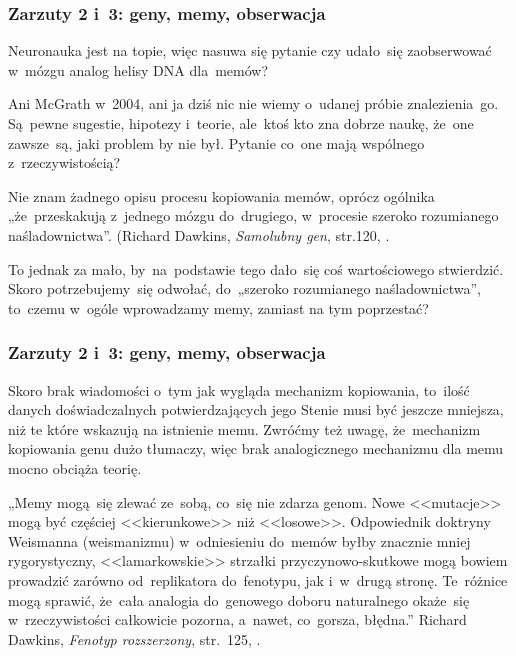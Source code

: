 \documentclass[10pt,t]{beamer}
\begin{document}
\begin{frame}
  \frametitle{Zarzuty 2 i~3: geny, memy, obserwacja}


  Neuronauka jest na topie, więc nasuwa się pytanie
  czy udało~się zaobserwować w~mózgu analog helisy DNA dla~memów?

  Ani McGrath w~2004, ani ja dziś nic nie wiemy o~udanej próbie
  znalezienia~go. Są~pewne sugestie, hipotezy i~teorie, ale~ktoś kto
  zna dobrze naukę, że~one zawsze~są, jaki problem by nie był.
  Pytanie co~one mają wspólnego z~rzeczywistością?

  Nie znam żadnego opisu procesu kopiowania memów, oprócz ogólnika
  „że~przeskakują z~jednego mózgu do~drugiego, w~procesie szeroko
  rozumianego naśladownictwa”. (Richard Dawkins, \textit{Samolubny gen},
  str.120, \cite{McGrathBogDawkinsa2008}.

  To jednak za mało, by~na~podstawie tego dało~się coś wartościowego
  stwierdzić. Skoro potrzebujemy~się odwołać, do~„szeroko
  rozumianego naśladownictwa”, to~czemu w~ogóle wprowadzamy memy,
  zamiast na tym poprzestać?

\end{frame}





\begin{frame}
  \frametitle{Zarzuty 2 i~3: geny, memy, obserwacja}


  Skoro brak wiadomości o~tym jak wygląda mechanizm kopiowania,
  to~ilość danych doświadczalnych potwierdzających jego Stenie musi być
  jeszcze mniejsza, niż te które wskazują na istnienie memu. Zwróćmy też
  uwagę, że~mechanizm kopiowania genu dużo tłumaczy, więc brak
  analogicznego mechanizmu dla memu mocno obciąża teorię.

  „Memy mogą~się zlewać ze~sobą, co~się nie zdarza genom. Nowe
  <<mutacje>> mogą być częściej <<kierunkowe>> niż <<losowe>>.
  Odpowiednik doktryny Weismanna (weismanizmu) w~odniesieniu
  do~memów byłby znacznie mniej rygorystyczny, <<lamarkowskie>>
  strzałki przyczynowo-skutkowe mogą bowiem prowadzić zarówno
  od~replikatora do~fenotypu, jak i~w~drugą stronę. Te~różnice mogą
  sprawić, że~cała analogia do~genowego doboru naturalnego okaże~się
  w~rzeczywistości całkowicie pozorna, a~nawet, co~gorsza, błędna.”
  Richard Dawkins, \textit{Fenotyp rozszerzony}, str.~125,
  \cite{McGrathBogDawkinsa2008}.

\end{frame}
\end{document}
